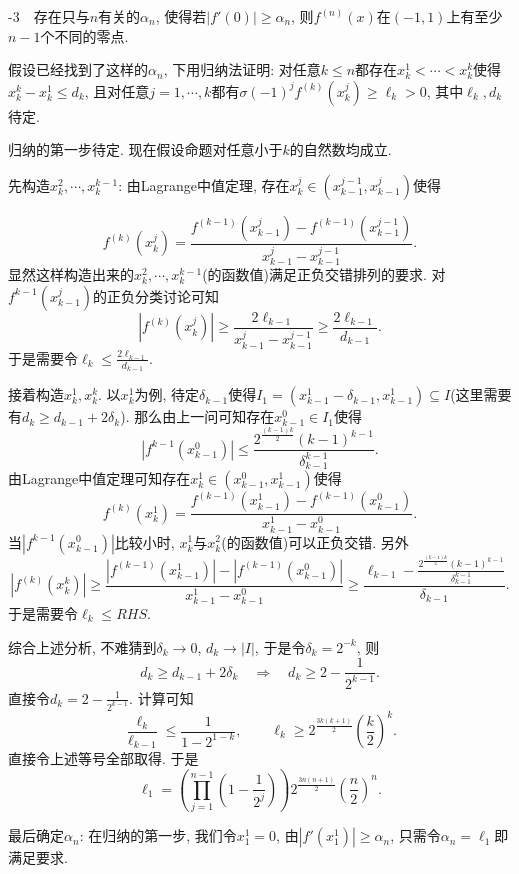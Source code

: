 -3~~存在只与$n$有关的$\alpha _n$, 使得若$|f'(0)| \geq \alpha _n$, 则$f^{(n)}(x)$在$(-1,1)$上有至少$n-1$个不同的零点. 
\begin{exsolution}
	假设已经找到了这样的$\alpha _n$, 下用归纳法证明: 对任意$k \leq n$都存在$x_k^1<\cdots <x_k^k$使得$x_k^k-x_k^1 \leq d_k$, 且对任意$j=1,\cdots ,k$都有$\sigma (-1)^{j} f^{(k)}(x_k^j) \geq \ell _k >0$, 其中$\ell _k,d_k$待定. 
	
	归纳的第一步待定. 现在假设命题对任意小于$k$的自然数均成立. 
	
	先构造$x_k^2,\cdots ,x_k^{k-1}$: 由Lagrange中值定理, 存在$x_k^j \in (x_{k-1}^{j-1},x_{k-1}^{j})$使得
	
	$$f^{(k)}(x_k^j) = \frac{f^{(k-1)}(x_{k-1}^{j}) - f^{(k-1)}(x_{k-1}^{j-1})}{x_{k-1}^{j}-x_{k-1}^{j-1}}. $$
	显然这样构造出来的$x_k^2,\cdots ,x_k^{k-1}$(的函数值)满足正负交错排列的要求. 对$f^{k-1}(x_{k-1}^{j})$的正负分类讨论可知$$|f^{(k)}(x_k^j)| \geq \frac{2\ell _{k-1}}{x_{k-1}^{j}-x_{k-1}^{j-1}} \geq \frac{2\ell _{k-1}}{d_{k-1}}. $$
	于是需要令$\ell _k \leq \frac{2\ell _{k-1}}{d_{k-1}}$. 
	
	接着构造$x_k^1,x_k^{k}$. 以$x_k^1$为例, 待定$\delta _{k-1}$使得$I_1=(x_{k-1}^1-\delta _{k-1},x_{k-1}^1) \subseteq I$(这里需要有$d_k \geq d_{k-1}+2\delta _k$). 那么由上一问可知存在$x_{k-1}^{0} \in I_1$使得$$|f^{k-1}(x_{k-1}^{0})| \leq \frac{2^{ \frac{(k-1)k}{2} } (k-1)^{k-1}}{\delta _{k-1}^{k-1}}. $$
	由Lagrange中值定理可知存在$x_k^1 \in (x_{k-1}^{0},x_{k-1}^{1})$使得$$f^{(k)}(x_k^1) = \frac{f^{(k-1)}(x_{k-1}^1) - f^{(k-1)}(x_{k-1}^0)}{x_{k-1}^1 - x_{k-1}^0}. $$
	当$|f^{k-1}(x_{k-1}^{0})|$比较小时, $x_k^1$与$x_k^2$(的函数值)可以正负交错. 另外$$|f^{(k)}(x_k^k)| \geq \frac{|f^{(k-1)}(x_{k-1}^1)| - |f^{(k-1)}(x_{k-1}^0)|}{x_{k-1}^1 - x_{k-1}^0} \geq \frac{\ell _{k-1} - \frac{2^{ \frac{(k-1)k}{2} } (k-1)^{k-1}}{\delta _{k-1}^{k-1}}}{\delta _{k-1}}. $$
	于是需要令$\ell _k \leq RHS$. 
	
	综合上述分析, 不难猜到$\delta _k \to 0$, $d_k \to |I|$, 于是令$\delta _k = 2^{-k}$, 则$$d_k \geq d_{k-1}+2\delta _k \quad \Rightarrow \quad d_k \geq 2-\frac{1}{2^{k-1}}. $$
	直接令$d_k = 2-\frac{1}{2^{k-1}}$. 计算可知$$\frac{\ell _k}{\ell _{k-1}} \leq \frac{1}{1-2^{1-k}},\qquad \ell _k \geq 2^{ \frac{3k(k+1)}{2} } \left( \frac{k}{2} \right)^k. $$
	直接令上述等号全部取得. 于是$$\ell _1 = \left( \prod_{j=1}^{n-1} \left( 1-\frac{1}{2^j} \right) \right) 2^{ \frac{3n(n+1)}{2} } \left( \frac{n}{2} \right)^n. $$
	
	最后确定$\alpha _n$: 在归纳的第一步, 我们令$x_1^1=0$, 由$|f'(x_1^1)| \geq \alpha _n$, 只需令$\alpha _n=\ell _1$即满足要求. 
\end{exsolution}










